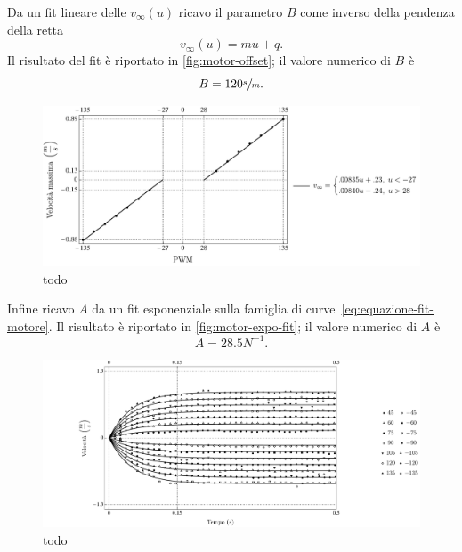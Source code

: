 Da un fit lineare delle $v_\infty(u)$ ricavo il parametro $B$ come inverso
della pendenza della retta
\begin{equation}
    v_\infty(u) = m u + q.
    \label{eq:vinfmuq}
\end{equation}
Il risultato del fit è riportato in \autoref{fig:motor-offset}; il valore
numerico di $B$ è
\begin{equation*}
    B = 120 \sfrac s m.
\end{equation*}

\begin{figure}[H]
    \centering
    \includegraphics[width=\textwidth]{docs/report/assets/motor-offset}
    \caption[todo]{todo}
    \label{fig:motor-offset}
\end{figure}


Infine ricavo $A$ da un fit esponenziale sulla famiglia di curve~\eqref{eq:equazione-fit-motore}. Il risultato è riportato in \autoref{fig:motor-expo-fit}; il valore
numerico di $A$ è
\begin{equation*}
    A = 28.5 N^{-1}.
\end{equation*}

\begin{figure}[H]
    \centering
    \includegraphics[width=\textwidth]{docs/report/assets/motor-expo-fit}
    \caption[todo]{todo}
    \label{fig:motor-expo-fit}
\end{figure}

